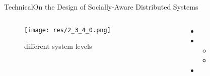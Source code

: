 \begin{frame}{Technical}{On the Design of Socially-Aware Distributed Systems \cite{kourtellis_design_2012}}


	\begin{columns}
		\begin{column}{0.5\textwidth}
			\begin{center}
			
				\begin{figure}
					\texttt{[image: res/2\_3\_4\_0.png]}
					\caption{\label{fig:2_3_4_0} different system levels}
				\end{figure}
				
			\end{center}
		\end{column}
		
		\begin{column}{0.5\textwidth}
		
			\begin{itemize}
				\item 
				
				\item 
					\begin{itemize}
						\item 
						\item 
					\end{itemize}
				
				\item 
			\end{itemize}
			
		\end{column}
	\end{columns}
	

\end{frame}

